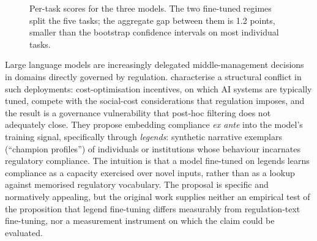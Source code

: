 \documentclass[pdflatex, sn-apa]{sn-jnl}%
\theoremstyle{thmstyleone}%
\theoremstyle{thmstyletwo}%
\theoremstyle{thmstylethree}%
\begin{document}
\begin{figure}[t]
\centering
{}
\caption{Per-task scores for the three models. The two fine-tuned regimes
split the five tasks; the aggregate gap between them is 1.2 points, smaller
than the bootstrap confidence intervals on most individual tasks.}
\label{fig:teaser}
\end{figure}

Large language models are increasingly delegated middle-management decisions
in domains directly governed by regulation. \citet{sargsyan2025legends}
characterise a structural conflict in such deployments: cost-optimisation
incentives, on which AI systems are typically tuned, compete with the
social-cost considerations that regulation imposes, and the result is a
governance vulnerability that post-hoc filtering does not adequately close.
They propose embedding compliance \emph{ex ante} into the model's training
signal, specifically through \emph{legends}: synthetic narrative exemplars
(``champion profiles'') of individuals or institutions whose behaviour
incarnates regulatory compliance. The intuition is that a model fine-tuned on
legends learns compliance as a capacity exercised over novel inputs, rather
than as a lookup against memorised regulatory vocabulary. The proposal is
specific and normatively appealing, but the original work supplies neither an
empirical test of the proposition that legend fine-tuning differs measurably
from regulation-text fine-tuning, nor a measurement instrument on which the
claim could be evaluated.
\end{document}
